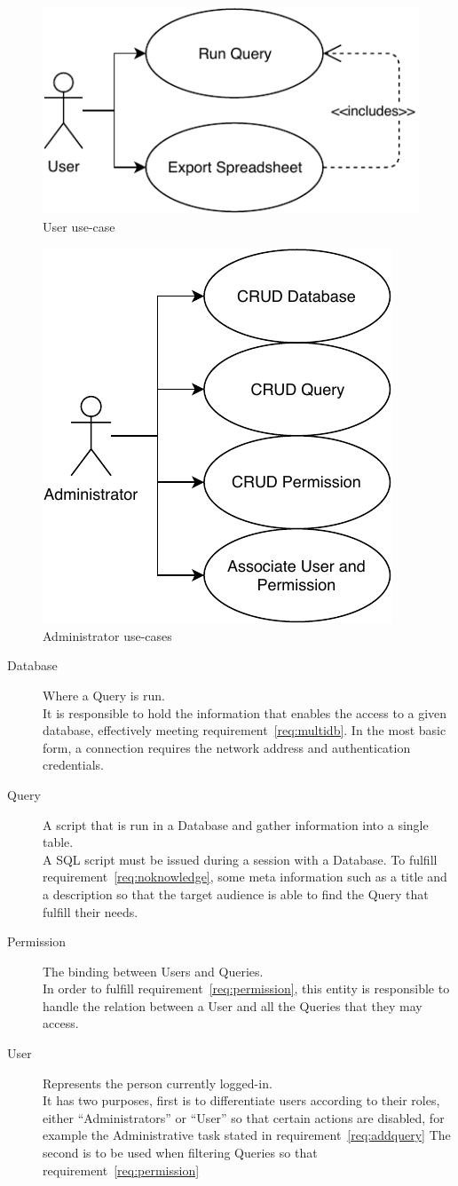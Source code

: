 \begin{figure}
  \centering
  \includegraphics[width=.5\textwidth]{images/diagramas/userusecase}
  \caption{User use-case}\label{fig:userusecase}
\end{figure}

\begin{figure}
  \centering
  \includegraphics[width=.5\textwidth]{images/diagramas/adminusecase}
  \caption{Administrator use-cases}\label{fig:adminusecases}
\end{figure}

\begin{description}
\item[Database] Where a Query is run.\\
  It is responsible to hold the information that enables the access to a given database, effectively meeting requirement~\ref{req:multidb}.
  In the most basic form, a connection requires the network address and authentication credentials.
\item[Query] A script that is run in a Database and gather information into a single table.\\
  A \gls{SQL} script must be issued during a session with a Database.
  To fulfill requirement~\ref{req:noknowledge}, some meta information such as a title and a description so that the target audience is able to find the Query that fulfill their needs.
\item[Permission] The binding between Users and Queries.\\
  In order to fulfill requirement~\ref{req:permission}, this entity is responsible to handle the relation between a User and all the Queries that they may access.
\item[User] Represents the person currently logged-in.\\
  It has two purposes, first is to differentiate users according to their roles, either ``Administrators'' or ``User'' so that certain actions are disabled, for example the Administrative task stated in requirement~\ref{req:addquery}
  The second is to be used when filtering Queries so that requirement~\ref{req:permission}
\end{description}

